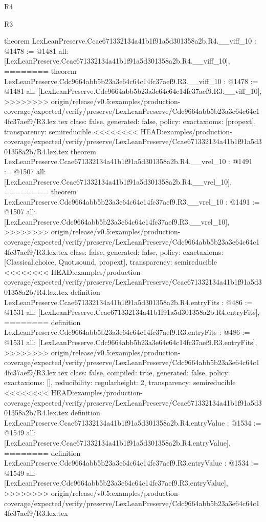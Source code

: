 \begin{lexlean}{R4}
\begin{lexlean}{R3}
\begin{coremodule}
{{{{{{{theorem LexLeanPreserve.Ccae671332134a41b1f91a5d301358a2b.R4.__viff_10 : @1478 := @1481 {
  all: [LexLeanPreserve.Ccae671332134a41b1f91a5d301358a2b.R4.__viff_10],
========
theorem LexLeanPreserve.Cdc9664abb5b23a3e64c64c14fc37aef9.R3.__viff_10 : @1478 := @1481 {
  all: [LexLeanPreserve.Cdc9664abb5b23a3e64c64c14fc37aef9.R3.__viff_10],
>>>>>>>> origin/release/v0.5:examples/production-coverage/expected/verify/preserve/LexLeanPreserve/Cdc9664abb5b23a3e64c64c14fc37aef9/R3.lex.tex
  class: false,
  generated: false,
  policy: exact{axioms: [propext]},
  transparency: semireducible
}
<<<<<<<< HEAD:examples/production-coverage/expected/verify/preserve/LexLeanPreserve/Ccae671332134a41b1f91a5d301358a2b/R4.lex.tex
theorem LexLeanPreserve.Ccae671332134a41b1f91a5d301358a2b.R4.__vrel_10 : @1491 := @1507 {
  all: [LexLeanPreserve.Ccae671332134a41b1f91a5d301358a2b.R4.__vrel_10],
========
theorem LexLeanPreserve.Cdc9664abb5b23a3e64c64c14fc37aef9.R3.__vrel_10 : @1491 := @1507 {
  all: [LexLeanPreserve.Cdc9664abb5b23a3e64c64c14fc37aef9.R3.__vrel_10],
>>>>>>>> origin/release/v0.5:examples/production-coverage/expected/verify/preserve/LexLeanPreserve/Cdc9664abb5b23a3e64c64c14fc37aef9/R3.lex.tex
  class: false,
  generated: false,
  policy: exact{axioms: [Classical.choice, Quot.sound, propext]},
  transparency: semireducible
}
<<<<<<<< HEAD:examples/production-coverage/expected/verify/preserve/LexLeanPreserve/Ccae671332134a41b1f91a5d301358a2b/R4.lex.tex
definition LexLeanPreserve.Ccae671332134a41b1f91a5d301358a2b.R4.entryFits : @486 := @1531 {
  all: [LexLeanPreserve.Ccae671332134a41b1f91a5d301358a2b.R4.entryFits],
========
definition LexLeanPreserve.Cdc9664abb5b23a3e64c64c14fc37aef9.R3.entryFits : @486 := @1531 {
  all: [LexLeanPreserve.Cdc9664abb5b23a3e64c64c14fc37aef9.R3.entryFits],
>>>>>>>> origin/release/v0.5:examples/production-coverage/expected/verify/preserve/LexLeanPreserve/Cdc9664abb5b23a3e64c64c14fc37aef9/R3.lex.tex
  class: false,
  compiled: true,
  generated: false,
  policy: exact{axioms: []},
  reducibility: regular{height: 2},
  transparency: semireducible
}
<<<<<<<< HEAD:examples/production-coverage/expected/verify/preserve/LexLeanPreserve/Ccae671332134a41b1f91a5d301358a2b/R4.lex.tex
definition LexLeanPreserve.Ccae671332134a41b1f91a5d301358a2b.R4.entryValue : @1534 := @1549 {
  all: [LexLeanPreserve.Ccae671332134a41b1f91a5d301358a2b.R4.entryValue],
========
definition LexLeanPreserve.Cdc9664abb5b23a3e64c64c14fc37aef9.R3.entryValue : @1534 := @1549 {
  all: [LexLeanPreserve.Cdc9664abb5b23a3e64c64c14fc37aef9.R3.entryValue],
>>>>>>>> origin/release/v0.5:examples/production-coverage/expected/verify/preserve/LexLeanPreserve/Cdc9664abb5b23a3e64c64c14fc37aef9/R3.lex.tex
}}}}}}}}}}}}
\end{coremodule}
\end{lexlean}
\end{lexlean}
